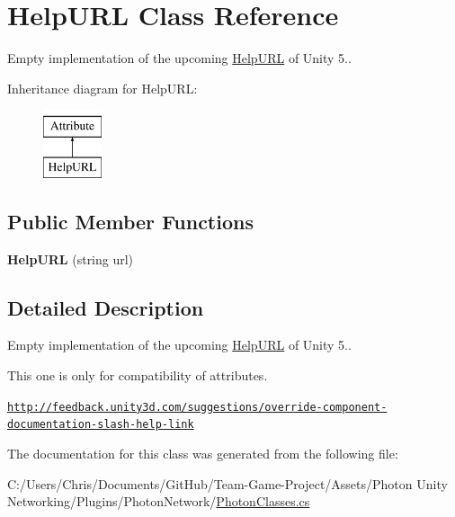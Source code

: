 \hypertarget{class_help_u_r_l}{}\section{Help\+U\+RL Class Reference}
\label{class_help_u_r_l}


Empty implementation of the upcoming \hyperlink{class_help_u_r_l}{Help\+U\+RL} of Unity 5..  


Inheritance diagram for Help\+U\+RL\+:\begin{figure}[H]
\begin{center}
\leavevmode
\includegraphics[height=2.000000cm]{class_help_u_r_l}
\end{center}
\end{figure}
\subsection*{Public Member Functions}
\begin{DoxyCompactItemize}
\item 
{\bfseries Help\+U\+RL} (string url)\hypertarget{class_help_u_r_l_a05ccd7cc690df9533724d2c7cc8419d8}{}\label{class_help_u_r_l_a05ccd7cc690df9533724d2c7cc8419d8}

\end{DoxyCompactItemize}


\subsection{Detailed Description}
Empty implementation of the upcoming \hyperlink{class_help_u_r_l}{Help\+U\+RL} of Unity 5.. 

This one is only for compatibility of attributes.

\href{http://feedback.unity3d.com/suggestions/override-component-documentation-slash-help-link}{\tt http\+://feedback.\+unity3d.\+com/suggestions/override-\/component-\/documentation-\/slash-\/help-\/link}

The documentation for this class was generated from the following file\+:\begin{DoxyCompactItemize}
\item 
C\+:/\+Users/\+Chris/\+Documents/\+Git\+Hub/\+Team-\/\+Game-\/\+Project/\+Assets/\+Photon Unity Networking/\+Plugins/\+Photon\+Network/\hyperlink{_photon_classes_8cs}{Photon\+Classes.\+cs}\end{DoxyCompactItemize}

